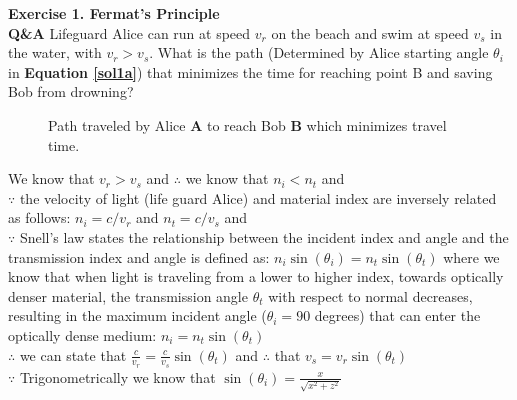 \documentclass[main.tex]{subfiles}
\begin{document}
\textbf{Exercise 1. Fermat's Principle}\\
\textbf{Q\&A} Lifeguard Alice can run at speed $v_r$ on the beach and swim at speed $v_s$ in the water, with $v_r > v_s$. What is the path (Determined by Alice starting angle $\theta_i$ in \textbf{Equation \ref{sol1a}}) that minimizes the time for reaching point B and saving Bob from drowning?\\

\begin{figure}
\centering{}
\caption{Path traveled by Alice \textbf{A} to reach Bob \textbf{B} which minimizes travel time.}
\label{fig:1}
\end{figure}

We know that $v_r > v_s$ and $\therefore$ we know that $n_i < n_t$ and \\

$\because$ the velocity of light (life guard Alice) and material index are inversely related as follows:  $n_i = c / v_r$ and $n_t = c / v_s$ and \\

$\because$ Snell's law states the relationship between the incident index and angle and the transmission index and angle is defined as: $n_i\sin(\theta_i) = n_t \sin(\theta_{t})$ where we know that when light is traveling from a lower to higher index, towards optically denser material, the transmission angle $\theta_t$ with respect to normal decreases, resulting in the maximum incident angle ($\theta_i = 90$ degrees) that can enter the optically dense medium: $n_i = n_t \sin(\theta_t)$\\

$\therefore$ we can state that $\frac{c}{v_r} = \frac{c}{v_s} \sin(\theta_t)$ and $\therefore$ that $v_s = v_r \sin(\theta_t)$\\

$\because$ Trigonometrically we know that $\sin(\theta_i) = \frac{x}{\sqrt{x^2 + z^2}}$\\
\end{document}
